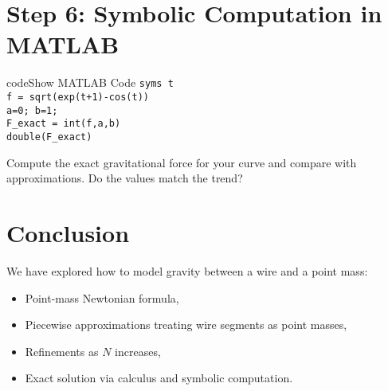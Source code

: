 \documentclass{ximera}
\begin{document}
\section*{Step 6: Symbolic Computation in MATLAB}

\begin{expandable}{code}{Show MATLAB Code}
\texttt{syms t}\\
\texttt{f = sqrt(exp(t+1)-cos(t))}\\
\texttt{a=0; b=1;}\\
\texttt{F\_exact = int(f,a,b)}\\
\texttt{double(F\_exact)}
\end{expandable}

\begin{problem}
Compute the exact gravitational force for your curve and compare with approximations. Do the values match the trend? 
\end{problem}

\section*{Conclusion}

We have explored how to model gravity between a wire and a point mass:
\begin{itemize}
\item Point-mass Newtonian formula,
\item Piecewise approximations treating wire segments as point masses,
\item Refinements as $N$ increases,
\item Exact solution via calculus and symbolic computation.
\end{itemize}
\end{document}
